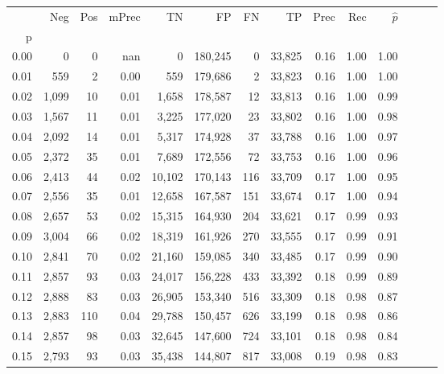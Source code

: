 \begin{tabular}{rrrrrrrrrrrrrr}
\toprule
{} &    Neg &  Pos & mPrec &       TN &       FP &      FN &      TP &  Prec &   Rec & $\hat{p}$ \\
p    &        &      &       &          &          &         &         &       &       &           \\
\midrule
0.00 &      0 &    0 &   nan &        0 &  180,245 &       0 &  33,825 &  0.16 &  1.00 &      1.00 \\
0.01 &    559 &    2 &  0.00 &      559 &  179,686 &       2 &  33,823 &  0.16 &  1.00 &      1.00 \\
0.02 &  1,099 &   10 &  0.01 &    1,658 &  178,587 &      12 &  33,813 &  0.16 &  1.00 &      0.99 \\
0.03 &  1,567 &   11 &  0.01 &    3,225 &  177,020 &      23 &  33,802 &  0.16 &  1.00 &      0.98 \\
0.04 &  2,092 &   14 &  0.01 &    5,317 &  174,928 &      37 &  33,788 &  0.16 &  1.00 &      0.97 \\
0.05 &  2,372 &   35 &  0.01 &    7,689 &  172,556 &      72 &  33,753 &  0.16 &  1.00 &      0.96 \\
0.06 &  2,413 &   44 &  0.02 &   10,102 &  170,143 &     116 &  33,709 &  0.17 &  1.00 &      0.95 \\
0.07 &  2,556 &   35 &  0.01 &   12,658 &  167,587 &     151 &  33,674 &  0.17 &  1.00 &      0.94 \\
0.08 &  2,657 &   53 &  0.02 &   15,315 &  164,930 &     204 &  33,621 &  0.17 &  0.99 &      0.93 \\
0.09 &  3,004 &   66 &  0.02 &   18,319 &  161,926 &     270 &  33,555 &  0.17 &  0.99 &      0.91 \\
0.10 &  2,841 &   70 &  0.02 &   21,160 &  159,085 &     340 &  33,485 &  0.17 &  0.99 &      0.90 \\
0.11 &  2,857 &   93 &  0.03 &   24,017 &  156,228 &     433 &  33,392 &  0.18 &  0.99 &      0.89 \\
0.12 &  2,888 &   83 &  0.03 &   26,905 &  153,340 &     516 &  33,309 &  0.18 &  0.98 &      0.87 \\
0.13 &  2,883 &  110 &  0.04 &   29,788 &  150,457 &     626 &  33,199 &  0.18 &  0.98 &      0.86 \\
0.14 &  2,857 &   98 &  0.03 &   32,645 &  147,600 &     724 &  33,101 &  0.18 &  0.98 &      0.84 \\
0.15 &  2,793 &   93 &  0.03 &   35,438 &  144,807 &     817 &  33,008 &  0.19 &  0.98 &      0.83 \\

\end{tabular}
